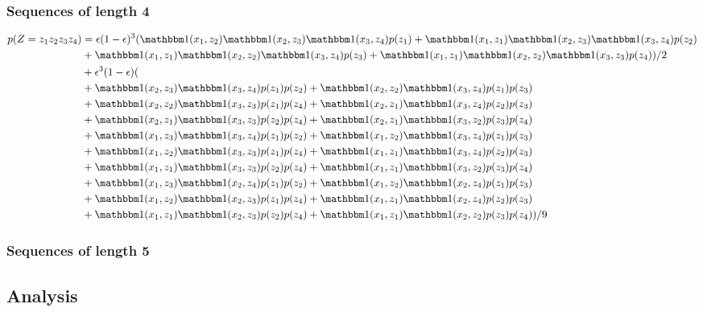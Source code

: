 \subsubsection{Sequences of length 4}

\begin{equation*}
  \begin{split}
    p(Z=z_1z_2z_3z_4)
      &= \e(1-\e)^3 (\I(x_1, z_2)\I(x_2, z_3)\I(x_3, z_4)p(z_1)
      +\I(x_1, z_1)\I(x_2, z_3)\I(x_3, z_4)p(z_2)\\
      &+\I(x_1, z_1)\I(x_2, z_2)\I(x_3, z_4)p(z_3)
      +\I(x_1, z_1)\I(x_2, z_2)\I(x_3, z_3)p(z_4))/2\\
      &+\e^3(1-\e)(\\
      &+ \I(x_2, z_3)\I(x_3, z_4)p(z_1)p(z_2) + \I(x_2, z_2)\I(x_3, z_4)p(z_1)p(z_3)\\
      &+ \I(x_2, z_2)\I(x_3, z_3)p(z_1)p(z_4) + \I(x_2, z_1)\I(x_3, z_4)p(z_2)p(z_3)\\
      &+ \I(x_2, z_1)\I(x_3, z_3)p(z_2)p(z_4) + \I(x_2, z_1)\I(x_3, z_2)p(z_3)p(z_4)\\
      &+ \I(x_1, z_3)\I(x _3, z_4)p(z_1)p(z_2) + \I(x_1, z_2)\I(x_3, z_4)p(z_1)p(z_3)\\
      &+ \I(x_1, z_2)\I(x_3, z_3)p(z_1)p(z_4) + \I(x_1, z_1)\I(x_3, z_4)p(z_2)p(z_3)\\
      &+ \I(x_1, z_1)\I(x_3, z_3)p(z_2)p(z_4) + \I(x_1, z_1)\I(x_3, z_2)p(z_3)p(z_4)\\
      &+ \I(x_1, z_3)\I(x_2, z_4)p(z_1)p(z_2) + \I(x_1, z_2)\I(x_2, z_4)p(z_1)p(z_3)\\
      &+ \I(x_1, z_2)\I(x_2, z_3)p(z_1)p(z_4) + \I(x_1, z_1)\I(x_2, z_4)p(z_2)p(z_3)\\
      &+ \I(x_1, z_1)\I(x_2, z_3)p(z_2)p(z_4) + \I(x_1, z_1)\I(x_2, z_2)p(z_3)p(z_4))/9
  \end{split}
\end{equation*}

\subsubsection{Sequences of length 5}

\subsection{Analysis}

